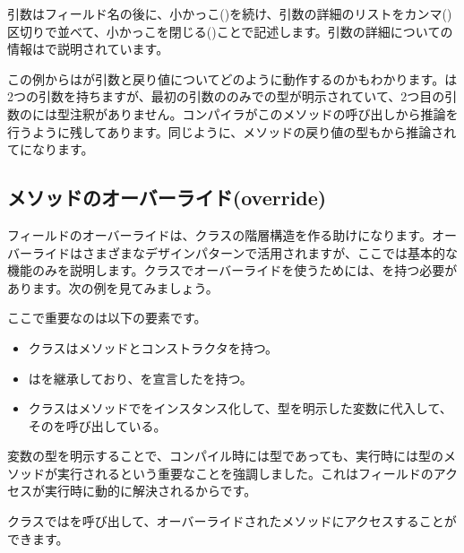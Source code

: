 
引数はフィールド名の後に、小かっこ(\expr{(})を続け、引数の詳細のリストをカンマ(\expr{,})区切りで並べて、小かっこを閉じる(\expr{)})ことで記述します。引数の詳細についての情報はで説明されています。

この例からはが引数と戻り値についてどのように動作するのかもわかります。は2つの引数を持ちますが、最初の引数ののみでの型が明示されていて、2つ目の引数のには型注釈がありません。コンパイラがこのメソッドの呼び出しから推論を行うように残してあります。同じように、メソッドの戻り値の型もから推論されてになります。

\subsection{メソッドのオーバーライド(override)}
\label{class-field-overriding}

フィールドのオーバーライドは、クラスの階層構造を作る助けになります。オーバーライドはさまざまなデザインパターンで活用されますが、ここでは基本的な機能のみを説明します。クラスでオーバーライドを使うためには、を持つ必要があります。次の例を見てみましょう。


ここで重要なのは以下の要素です。

\begin{itemize}
	\item {}クラスはメソッドとコンストラクタを持つ。
	\item {}はを継承しており、を宣言したを持つ。
	\item {}クラスはメソッドでをインスタンス化して、型を明示した変数に代入して、そのを呼び出している。
\end{itemize}

変数の型を明示することで、コンパイル時には型であっても、実行時には型のメソッドが実行されるという重要なことを強調しました。これはフィールドのアクセスが実行時に動的に解決されるからです。

クラスではを呼び出して、オーバーライドされたメソッドにアクセスすることができます。

